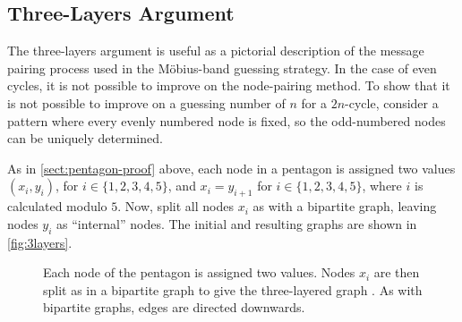 \subsection{Three-Layers Argument}

The three-layers argument is useful as a pictorial description of the message pairing process used in the M{\"o}bius-band guessing strategy. In the case of even cycles, it is not possible to improve on the node-pairing method. To show that it is not possible to improve on a guessing number of $n$ for a $2n$-cycle, consider a pattern where every evenly numbered node is fixed, so the odd-numbered nodes can be uniquely determined.

As in \autoref{sect:pentagon-proof} above, each node in a pentagon is assigned two values $(x_i, y_i)$, for $i \in \{1, 2, 3, 4, 5\}$, and $x_i = y_{i + 1}$ for $i \in \{1, 2, 3, 4, 5\}$, where $i$ is calculated modulo $5$. Now, split all nodes $x_i$ as with a bipartite graph, leaving nodes $y_i$ as ``internal'' nodes. The initial and resulting graphs are shown in \autoref{fig:3layers}.

\begin{figure}[ht]
     \centering
     \hspace{.3in}
     \caption[Three-layers argument before and after conversion]{Each node of the pentagon  is assigned two values. Nodes $x_i$ are then split as in a bipartite graph to give the three-layered graph . As with bipartite graphs, edges are directed downwards.}
     \label{fig:3layers}
\end{figure}

